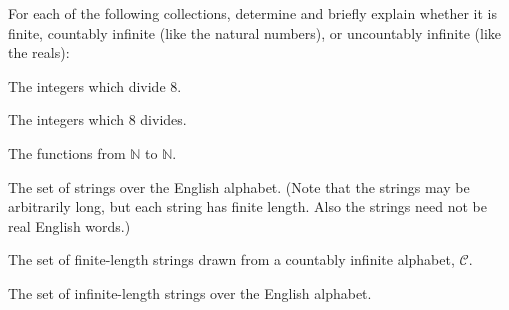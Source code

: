 \documentclass[11pt]{article}
\begin{document}

For each of the following collections, determine and briefly explain whether it
is finite, countably infinite (like the natural numbers), or uncountably infinite 
(like the reals):

\begin{Parts}

\Part The integers which divide $8$.

\Part The integers which $8$ divides.

\Part The functions from $\mathbb{N}$ to $\mathbb{N}$.

\Part The set of strings over the English alphabet. (Note that the strings may 
be arbitrarily long, but each string has finite length. Also the strings need 
not be real English words.)

\Part The set of finite-length strings drawn from a countably infinite alphabet, 
$\mathcal{C}$.

\Part The set of infinite-length strings over the English alphabet.

\end{Parts}
\end{document}
